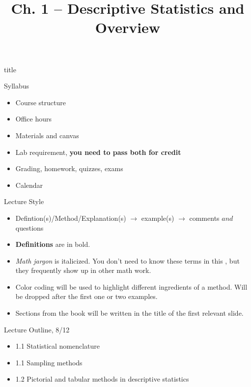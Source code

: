\documentclass{beamer}
\title{Ch. 1 -- Descriptive Statistics and Overview}
\newcommand{\blue}[1]{{\color{blue} #1}}
\newcommand{\red}[1]{{\color{red} #1}}
\begin{document}
\begin{frame}
    \begin{beamercolorbox}[rounded=true,wd=\textwidth,center]{title}
        \inserttitle
    \end{beamercolorbox}%

\end{frame}

\begin{frame}{Syllabus}
    \begin{itemize}
        \item Course structure
        \item Office hours
        \item Materials and canvas
        \item Lab requirement, {\bf you need to pass both for credit}
        \item Grading, homework, quizzes, exams
        \item Calendar
    \end{itemize}
\end{frame}

\begin{frame}{Lecture Style}
    \begin{itemize}
        \item Defintion(s)/Method/Explanation(s) $\rightarrow$ example(s) $\rightarrow$ comments $and$ questions
        \item {\bf Definitions} are in bold.
        \item {\it Math jargon} is italicized. You don't need to know these terms in this , but they frequently show up in other math work.
        \item \blue{Color} \red{coding} will be used to highlight different ingredients of a method. Will be dropped after the first one or two examples.
        \item Sections from the book will be written in the title of the first relevant slide.
    \end{itemize}
\end{frame}

\begin{frame}{Lecture Outline, 8/12}
    \begin{itemize}
        \item 1.1 Statistical nomenclature
        \item 1.1 Sampling methods
        \item 1.2 Pictorial and tabular methods in descriptive statistics
    \end{itemize}
\end{frame}
\end{document}
